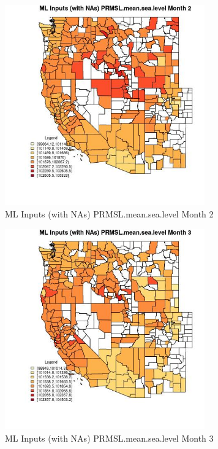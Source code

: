 \begin{figure} 
\centering  
\includegraphics[width=0.77\textwidth]{Code_Outputs/Report_ML_input_PM25_Step4_part_f_de_duplicated_aveswNAs_CountyPRMSLmeansealevelmedianMonth2.jpg} 
\caption{\label{fig:Report_ML_input_PM25_Step4_part_f_de_duplicated_aveswNAsCountyPRMSLmeansealevelmedianMonth2}ML Inputs (with NAs) PRMSL.mean.sea.level Month 2} 
\end{figure} 
 

\begin{figure} 
\centering  
\includegraphics[width=0.77\textwidth]{Code_Outputs/Report_ML_input_PM25_Step4_part_f_de_duplicated_aveswNAs_CountyPRMSLmeansealevelmedianMonth3.jpg} 
\caption{\label{fig:Report_ML_input_PM25_Step4_part_f_de_duplicated_aveswNAsCountyPRMSLmeansealevelmedianMonth3}ML Inputs (with NAs) PRMSL.mean.sea.level Month 3} 
\end{figure} 
 

